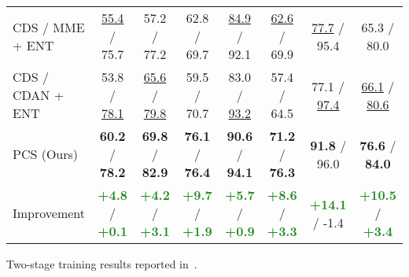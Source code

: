 \documentclass[final]{cvpr}
\newcommand{\FG}[1]{\textcolor{ForestGreen}{\textbf{#1}}}
\begin{document}
\begin{table*}[t]
{\begin{threeparttable}
\begin{tabular}{l|c|c|c|c|c|c|c}
CDS / MME + ENT & {\underline{55.4} / 75.7} & 57.2 / 77.2 & 62.8 / 69.7 & {\underline{84.9} / 92.1} & \underline{62.6} / 69.9 & \underline{77.7} / 95.4 & 65.3 / 80.0 \\
CDS / CDAN + ENT   & 53.8 / \underline{78.1} & \underline{65.6} / \underline{79.8} & 59.5 / 70.7 & 83.0 / \underline{93.2} & 57.4 / 64.5 & 77.1 / \underline{97.4} & \underline{66.1} / \underline{80.6} \\
\midrule
PCS (Ours) & \textbf{60.2} / \textbf{78.2} & \textbf{69.8} / \textbf{82.9} & \textbf{76.1} / \textbf{76.4} & \textbf{90.6} / \textbf{94.1} & \textbf{71.2} / \textbf{76.3} & \textbf{91.8} / 96.0 & \textbf{76.6} / \textbf{84.0} \\
Improvement & \FG{+4.8} / \FG{+0.1} & \FG{+4.2} / \FG{+3.1} & \FG{+9.7} / \FG{+1.9} & \FG{+5.7} / \FG{+0.9} & \FG{+8.6} / \FG{+3.3} & \FG{+14.1} / -1.4 &  \FG{+10.5} / \FG{+3.4} \\
\bottomrule
\end{tabular}
\begin{tablenotes}
    \footnotesize
    \item[] Two-stage training results reported in~\cite{kim2020cross}.
\end{tablenotes}
\end{threeparttable}
}
\label{tab:office}
\end{table*}
\end{document}
